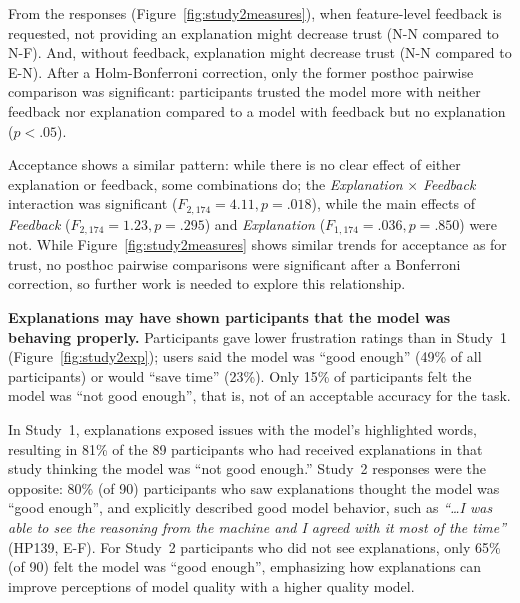 From the responses (Figure~\ref{fig:study2measures}), when feature-level feedback is requested, not providing an explanation might decrease trust (N-N compared to N-F). And, without feedback, explanation might decrease trust (N-N compared to E-N). After a Holm-Bonferroni correction, only the former posthoc pairwise comparison was significant: participants trusted the model more with neither feedback nor explanation compared to a model with feedback but no explanation ($p < .05$). 

Acceptance shows a similar pattern: while there is no clear effect of either explanation or feedback, some combinations do; the \textit{Explanation} $\times$ \textit{Feedback} interaction was significant ($F_{2,174}=4.11, p=.018$), while the main effects of \textit{Feedback} ($F_{2,174}=1.23, p=.295$) and \textit{Explanation} ($F_{1,174}=.036, p=.850$) were not. While Figure~\ref{fig:study2measures} shows similar trends for acceptance as for trust, no posthoc pairwise comparisons were significant after a Bonferroni correction, so further work is needed to explore this relationship.

\FigureHighExp


\textbf{Explanations may have shown participants that the model was behaving properly.}
%
Participants gave lower frustration ratings than in Study~1 (Figure~\ref{fig:study2exp}); users said the model was ``good enough'' (49\% of all participants) or would ``save time'' (23\%). Only 15\% of participants felt the model was ``not good enough'', that is, not of an acceptable accuracy for the task. 

In Study~1, explanations exposed issues with the model's highlighted words, resulting in 81\% of the 89 participants who had received explanations in that study thinking the model was ``not good enough.'' Study~2 responses were the opposite: 80\% (of 90) participants who saw explanations thought the model was ``good enough'', and  explicitly described good model behavior, such as \textit{``\dots I was able to see the reasoning from the machine and I agreed with it most of the time''} (HP139, E-F). For Study~2 participants who did not see explanations, only 65\% (of 90) felt the model was ``good enough'', emphasizing how explanations can improve perceptions of model quality with a higher quality model. 


